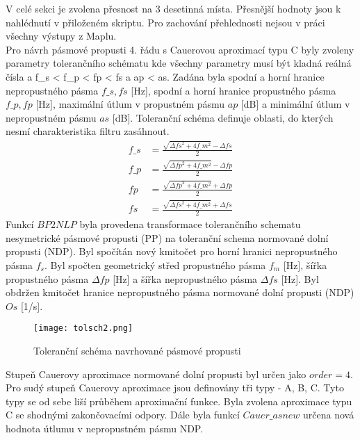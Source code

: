V celé sekci je zvolena přesnost na 3 desetinná místa. Přesnější hodnoty jsou k nahlédnutí v přiloženém skriptu. Pro zachování přehlednosti nejsou v práci všechny výstupy z Maplu.\\
Pro návrh pásmové propusti 4. řádu s Cauerovou aproximací typu C byly zvoleny parametry tolerančního schématu 
\noindent kde všechny parametry musí být kladná reálná čísla a f\_s <  f\_p < fp < fs a ap < as. Zadána byla spodní a horní hranice nepropustného pásma $f\_s,fs$ [Hz], spodní a horní hranice propustného pásma $f\_p,fp$ [Hz], maximální útlum v propustném pásmu $ap$ [dB] a minimální útlum v nepropustném pásmu $as$ [dB]. Toleranční schéma definuje oblasti, do kterých nesmí charakteristika filtru zasáhnout.
\begin{align}
f\_s &= \frac{\sqrt{\Delta{fs}^2+4f\_m ^2}-\Delta{fs}}{2}\\
f\_p &= \frac{\sqrt{\Delta{fp}^2+4f\_m ^2}-\Delta{fp}}{2}\\
fp &= \frac{\sqrt{\Delta{fp}^2+4f\_m ^2}+\Delta{fp}}{2}\\
fs &= \frac{\sqrt{\Delta{fs}^2+4f\_m ^2}+\Delta{fs}}{2}
\end{align}
Funkcí $BP2NLP$ byla provedena transformace tolerančního schematu nesymetrické pásmové propusti (PP) na toleranční schema normované dolní propusti (NDP). Byl spočítán nový kmitočet pro horní hranici nepropustného pásma $f_s$. Byl spočten geometrický střed propustného pásma $f_m$ [Hz], šířka propustného pásma $\Delta{fp}$ [Hz] a šířka nepropustného pásma $\Delta{fs}$ [Hz].
\noindent Byl obdržen kmitočet hranice nepropustného pásma normované dolní propusti (NDP) $Os$ [1/s].
\begin{figure}[h]
\centering
\texttt{[image: tolsch2.png]}
\caption{Toleranční schéma navrhované pásmové propusti}
\end{figure}
\noindent Stupeň Cauerovy aproximace normované dolní propusti byl určen jako $order = 4$. Pro sudý stupeň Cauerovy aproximace jsou definovány tři typy - A, B, C. Tyto typy se od sebe liší průběhem aproximační funkce. Byla zvolena aproximace typu C se shodnými zakončovacími odpory.
\noindent Dále byla funkcí $Cauer\_asnew$ určena nová hodnota útlumu v nepropustném pásmu NDP.

